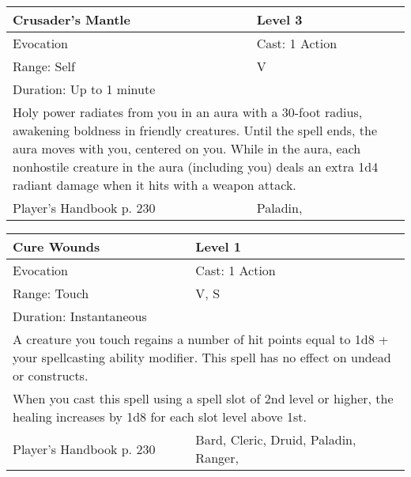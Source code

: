 \documentclass[11pt]{report}
\begin{document}
\begin{table}[H]
	\begin{tabular}{||p{6cm}|p{6cm}||}
		\hline\hline
		\bf{Crusader’s Mantle} & Level 3\\ \hline
		Evocation & Cast: 1 Action\\ \hline
		Range: Self & V\\ \hline
		Duration: Up to 1 minute & \\ \hline
		\multicolumn{2}{||p{12cm}||}{Holy power radiates from you in an aura with a 30-foot radius, awakening boldness in friendly creatures. Until the spell ends, the aura moves with you, centered on you. While in the aura, each nonhostile creature in the aura (including you) deals an extra 1d4 radiant damage when it hits with a weapon attack.}\\ \hline
Player's Handbook p. 230 & Paladin, \\ \hline\hline
	\end{tabular}
\end{table}

\begin{table}[H]
	\begin{tabular}{||p{6cm}|p{6cm}||}
		\hline\hline
		\bf{Cure Wounds} & Level 1\\ \hline
		Evocation & Cast: 1 Action\\ \hline
		Range: Touch & V, S\\ \hline
		Duration: Instantaneous & \\ \hline
		\multicolumn{2}{||p{12cm}||}{A creature you touch regains a number of hit points equal to 1d8 + your spellcasting ability modifier. This spell has no effect on undead or constructs.}\\ \hline
		\multicolumn{2}{||p{12cm}||}{When you cast this spell using a spell slot of 2nd level or higher, the healing increases by 1d8 for each slot level above 1st.}\\ \hline
Player's Handbook p. 230 & Bard, Cleric, Druid, Paladin, Ranger, \\ \hline\hline
	\end{tabular}
\end{table}
\end{document}

